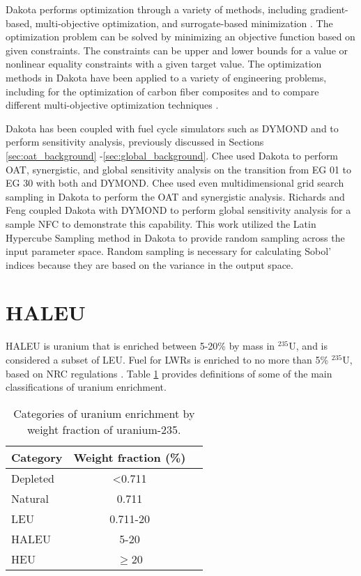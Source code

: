 Dakota performs optimization through a variety of methods, including
gradient-based, multi-objective optimization, and surrogate-based 
minimization \cite{adams_dakota_2021}. The optimization problem can be 
solved by minimizing an objective function based on given constraints. The 
constraints can be upper and lower bounds for a value or nonlinear 
equality constraints with a given target value. The optimization 
methods in Dakota have been applied to a variety of engineering problems,
including for the optimization of carbon fiber composites 
\cite{skulborstad_multi-objective_2018} and to compare different 
multi-objective optimization techniques \cite{chiandussi_comparison_2012}. 

Dakota has been coupled with fuel cycle simulators such as \gls{DYMOND} 
\cite{richards_application_2021} and \Cyclus \cite{chee_sensitivity_2019} 
to perform sensitivity 
analysis, previously discussed in Sections \ref{sec:oat_background} 
-\ref{sec:global_background}. Chee \cite{chee_sensitivity_2019} used Dakota to perform 
\gls{OAT}, synergistic, and global sensitivity analysis on the transition 
from \gls{EG} 01 to \gls{EG} 30 with both \Cyclus and \gls{DYMOND}. Chee used even 
multidimensional grid search sampling in Dakota to perform the \gls{OAT} 
and synergistic analysis. 
Richards and Feng \cite{richards_application_2021} coupled Dakota with 
\gls{DYMOND} to perform global sensitivity analysis for a sample \gls{NFC} 
to demonstrate this capability. This work utilized the Latin Hypercube 
Sampling method in Dakota to provide random sampling across the 
input parameter space. Random sampling is necessary for 
calculating Sobol' indices because they are based on the variance in 
the output space. 


%
%
%
\section{HALEU}
\gls{HALEU} is uranium that is enriched between 5-20\% by mass in 
$^{235}$U, and is considered a subset of \gls{LEU}. Fuel for \glspl{LWR} 
is enriched to no more than 5\% $^{235}$U, based on \gls{NRC} regulations 
\cite{noauthor_10_2006}. Table \ref{tab:enrichemnt} provides definitions 
of some of the main classifications of uranium enrichment. 

\begin{table}[ht]
    \centering
    \caption{Categories of uranium enrichment by weight fraction of 
    uranium-235.}
    \label{tab:enrichemnt}
    \begin{tabular}{l c c}
        \hline
        Category & Weight fraction (\%)\\\hline
        Depleted & <0.711 \\
        Natural & 0.711 \\
        \gls{LEU} & 0.711-20 \\
        \gls{HALEU} & 5-20 \\
        \gls{HEU} & $\ge$20 \\
        \hline
    \end{tabular}
\end{table}

